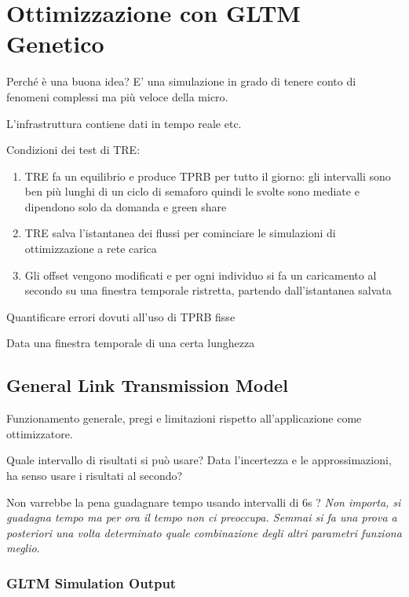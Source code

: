 \chapter{Ottimizzazione con GLTM Genetico}
Perché è una buona idea?
E' una simulazione in grado di tenere conto di fenomeni complessi ma più veloce della micro.

L'infrastruttura contiene dati in tempo reale etc.

Condizioni dei test di TRE:
\begin{enumerate}
\item TRE fa un equilibrio e produce TPRB per tutto il giorno: gli intervalli sono ben più lunghi di un ciclo di semaforo quindi le svolte sono mediate e dipendono solo da domanda e green share
\item TRE salva l'istantanea dei flussi per cominciare le simulazioni di ottimizzazione a rete carica
\item Gli offset vengono modificati e per ogni individuo si fa un caricamento al secondo su una finestra temporale ristretta, partendo dall'istantanea salvata
\end{enumerate}


Quantificare errori dovuti all'uso di TPRB fisse 

Data una finestra temporale di una certa lunghezza

\section{General Link Transmission Model}
Funzionamento generale, pregi e limitazioni rispetto all'applicazione come ottimizzatore.

Quale intervallo di risultati si può usare? Data l'incertezza e le approssimazioni, ha senso usare i risultati al secondo?

Non varrebbe la pena guadagnare tempo usando intervalli di 6s ?
\emph{Non importa, si guadagna tempo ma per ora il tempo non ci preoccupa. Semmai si fa una prova a posteriori una volta determinato quale combinazione degli altri parametri funziona meglio}.

\subsection{GLTM Simulation Output} \label{s:output}

